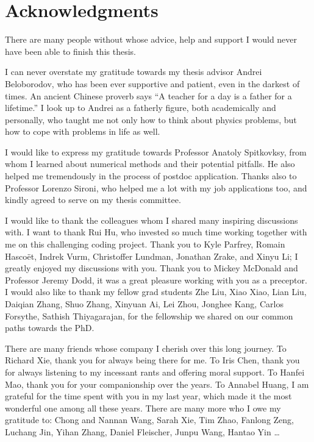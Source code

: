 \chapter*{Acknowledgments}
\label{chap:acknowledgments}

There are many people without whose advice, help and support I would never have
been able to finish this thesis.

I can never overstate my gratitude towards my thesis advisor Andrei Beloborodov,
who has been ever supportive and patient, even in the darkest of times. An
ancient Chinese proverb says ``A teacher for a day is a father for a lifetime.''
I look up to Andrei as a fatherly figure, both academically and personally, who
taught me not only how to think about physics problems, but how to cope with
problems in life as well.

I would like to express my gratitude towards Professor Anatoly Spitkovksy, from
whom I learned about numerical methods and their potential pitfalls. He also
helped me tremendously in the process of postdoc application. Thanks also to
Professor Lorenzo Sironi, who helped me a lot with my job applications too, and
kindly agreed to serve on my thesis committee.

I would like to thank the colleagues whom I shared many inspiring discussions
with. I want to thank Rui Hu, who invested so much time working together with me
on this challenging coding project. Thank you to Kyle Parfrey, Romain Hascoët,
Indrek Vurm, Christoffer Lundman, Jonathan Zrake, and Xinyu Li; I greatly
enjoyed my discussions with you. Thank you to Mickey McDonald and Professor
Jeremy Dodd, it was a great pleasure working with you as a preceptor. I would
also like to thank my fellow grad students Zhe Liu, Xiao Xiao, Lian Liu, Daiqian
Zhang, Shuo Zhang, Xinyuan Ai, Lei Zhou, Jonghee Kang, Carlos Forsythe, Sathish
Thiyagarajan, for the fellowship we shared on our common paths towards the PhD.

There are many friends whose company I cherish over this long journey. To
Richard Xie, thank you for always being there for me. To Iris Chen, thank you
for always listening to my incessant rants and offering moral support. To Hanfei
Mao, thank you for your companionship over the years. To Annabel Huang, I am
grateful for the time spent with you in my last year, which made it the most
wonderful one among all these years. There are many more who I owe my gratitude
to: Chong and Nannan Wang, Sarah Xie, Tim Zhao, Fanlong Zeng, Luchang Jin, Yihan
Zhang, Daniel Fleischer, Junpu Wang, Hantao Yin \dots

